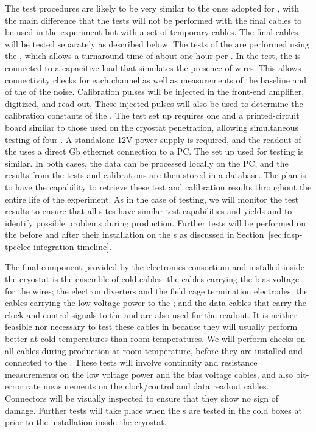 The test procedures are likely to be
very similar to the ones adopted for , with the main
difference that the tests will not be performed with
the final cables to be used in the experiment but 
with a set of temporary cables. The final cables will be tested
separately as described below. The tests of the 
are performed using the , which allows a turnaround
time of about one hour per . In the
test, the  is connected to a capacitive load that
simulates the presence of  wires. This allows
connectivity checks for each channel as well as measurements of
the baseline and of the \rms of the noise. Calibration 
pulses will be injected in the front-end amplifier, digitized,
and read out. These injected pulses will also be used
to determine the calibration constants of the . 
The test set up requires one  and
a printed-circuit board similar to those used on the cryostat
penetration, allowing simultaneous testing of four .
A standalone 12V power supply is required, and the readout
of the  uses a direct Gb ethernet connection to
a PC. The set up used for  testing is similar.
In both cases, the data can be processed locally on the PC,
and the results from the tests and calibrations are then stored 
in a database. The plan is to have the capability to retrieve  
these test and calibration results throughout the entire life
of the experiment. As in the case of  testing,
we will monitor the test results to ensure that all
sites have similar test capabilities and yields and to
identify possible problems during production.
Further tests will be performed on the 
before and after their installation on the s as
discussed in Section~\ref{sec:fdsp-tpcelec-integration-timeline}.

The final component provided by the  electronics consortium
and installed inside the cryostat is the ensemble of cold
cables: the cables carrying the bias voltage for the 
wires; the electron diverters and the field cage termination electrodes;
the cables carrying the low voltage power to the ;
and the data cables that carry the clock and control signals
to the  and are also used for the readout. It is neither
feasible nor necessary to test these cables in \lntwo
because they will usually perform better at cold temperatures than 
room temperatures. We will perform checks on all cables 
during production at room temperature, before they are installed and 
connected to the . These tests will involve continuity
and resistance measurements on the low voltage power and the bias voltage
cables, and also bit-error rate measurements on the clock/control and 
data readout cables. Connectors will be visually inspected to
ensure that they show no sign of damage.  Further tests will take place
when the s are tested in the cold boxes at 
prior to the installation inside the cryostat.

